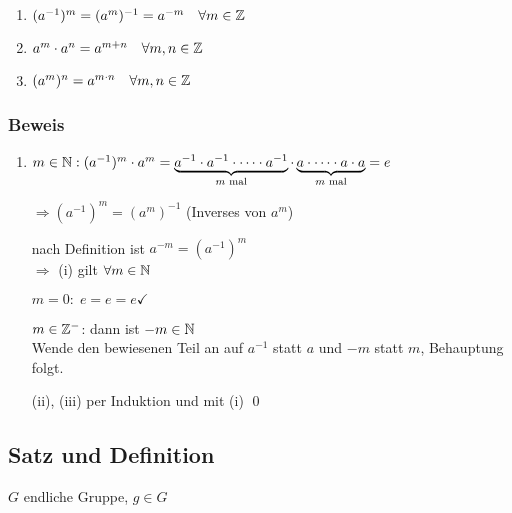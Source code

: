 {\renewcommand{\labelenumi}{(\roman{enumi})}
\begin{enumerate}
	\item
	$(a^{-1})^m = (a^m)^{-1} = a^{-m} \quad \forall m \in \mathbb{Z}$
	
	\item
	$a^m \cdot a^n = a^{m+n} \quad \forall m, n \in \mathbb{Z}$
	
	\item
	$(a^m)^n=a^{m \cdot n} \quad \forall m, n \in \mathbb{Z}$
\end{enumerate}

\subsubsection*{Beweis}
\begin{enumerate}
	\item
	$m \in \mathbb{N}: (a^{-1})^m \cdot a^m = \underbrace{a^{-1} \cdot a^{-1}\cdot \dots \cdot a^{-1}}_{m \text{ mal}} \cdot \underbrace{a \cdot \dots \cdot a \cdot a}_{m \text{ mal}} = e$
	
	$\Rightarrow (a^{-1})^m = (a^m)^{-1}$ (Inverses von $a^m$)
	
	nach Definition ist $a^{-m} = (a^{-1})^m$
	\\ $\Rightarrow $ (i) gilt $\forall m \in \mathbb{N}$
	
	$m = 0: \; e = e = e \checkmark$
	
	$m \in \mathbb{Z}^-$: dann ist $-m \in \mathbb{N}$
	\\ Wende den bewiesenen Teil an auf $a^{-1}$ statt $a$ und $-m$ statt $m$, Behauptung folgt.
	
	\item[(ii), (iii)]
	per Induktion und mit (i) \qed
\end{enumerate}}

\subsection[Satz und Definition: Ordnung, zyklische Gruppe]{Satz und Definition}
\label{zyklischeGruppe}

$G$ endliche Gruppe, $g \in G$

